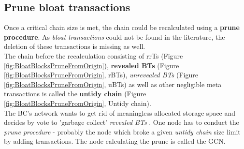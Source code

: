  \subsection{Prune bloat transactions}
 \label{sec:PruneProcedure}	
 Once a critical chain size is met, the chain could be recalculated using a \textbf{prune procedure}.
 As \textit{bloat transactions} could not be found in the literature, the deletion of these transactions is missing as well. \\
 The chain before the recalculation consisting of
 \gls{rrTs} (Figure \ref{fig:BloatBlocksPruneFromOrigin}),
 \textbf{revealed \gls{BT}s} (Figure \ref{fig:BloatBlocksPruneFromOrigin}, r\gls{BT}s),
 \textit{unrevealed \gls{BT}s} (Figure \ref{fig:BloatBlocksPruneFromOrigin}, u\gls{BT}s) as well as other negligible meta transactions
 is called the \textbf{untidy chain} (Figure \ref{fig:BloatBlocksPruneFromOrigin}, Untidy chain).\\
 The \gls{BC}'s network wants to get rid of meaningless allocated storage space and decides by vote to 'garbage collect' \textit{revealed \gls{BT}s} .
 One node has to conduct the \textit{prune procedure} - probably the node which broke a given \textit{untidy chain} size limit by adding transactions.
 The node calculating the prune is called the \gls{GCN}.
  \begin{figure}
 \end{figure}


